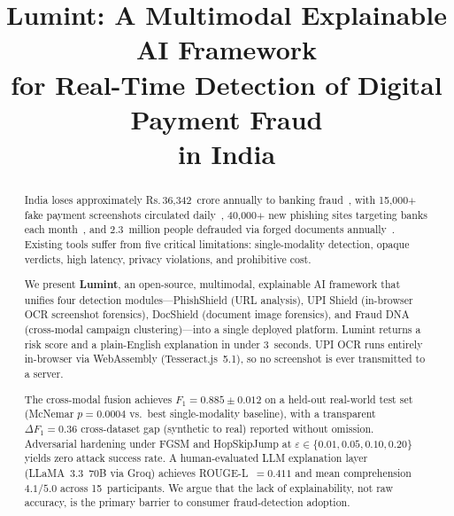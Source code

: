 \documentclass[conference]{IEEEtran}
\def\rupee{\textrm{Rs.\,}}
\begin{document}
\title{Lumint: A Multimodal Explainable AI Framework\\
for Real-Time Detection of Digital Payment Fraud\\
in India}

\author{
}

\maketitle

\begin{abstract}
India loses approximately \rupee{}36{,}342~crore annually to banking
fraud~\cite{rbi2024}, with 15{,}000$+$ fake payment screenshots
circulated daily~\cite{certin2024}, 40{,}000$+$ new phishing sites
targeting banks each month~\cite{apwg2024}, and 2.3~million people
defrauded via forged documents annually~\cite{rbi2023framework}.
Existing tools suffer from five critical limitations: single-modality
detection, opaque verdicts, high latency, privacy violations, and
prohibitive cost.

We present \textbf{Lumint}, an open-source, multimodal, explainable AI
framework that unifies four detection modules---PhishShield (URL
analysis), UPI Shield (in-browser OCR screenshot forensics), DocShield
(document image forensics), and Fraud DNA (cross-modal campaign
clustering)---into a single deployed platform. Lumint returns a risk
score and a plain-English explanation in under 3~seconds. UPI OCR runs
entirely in-browser via WebAssembly (Tesseract.js~5.1), so no screenshot
is ever transmitted to a server.

The cross-modal fusion achieves $F_1{=}0.885{\pm}0.012$ on a held-out
real-world test set (McNemar $p{=}0.0004$ vs.\ best single-modality
baseline), with a transparent $\Delta F_1{=}0.36$ cross-dataset gap
(synthetic to real) reported without omission. Adversarial hardening
under FGSM and HopSkipJump at $\varepsilon\!\in\!\{0.01,0.05,0.10,0.20\}$
yields zero attack success rate. A human-evaluated LLM explanation layer
(LLaMA~3.3~70B via Groq) achieves ROUGE-L~$=0.411$ and mean
comprehension $4.1/5.0$ across 15~participants. We argue that the lack
of explainability, not raw accuracy, is the primary barrier to consumer
fraud-detection adoption.
\end{abstract}
\end{document}
